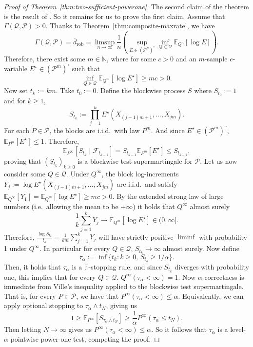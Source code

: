 \documentclass[11pt]{article}
\newcommand{\E}{\mathbb{E}}
\newcommand{\Pcal}{\mathcal{P}}
\newcommand{\Qcal}{\mathcal{Q}}
\newcommand{\bbF}{\mathbb F}
\theoremstyle{definition}
\theoremstyle{definition}
\begin{document}
\begin{proof}[Proof of Theorem~\ref{thm:two-sufficient-powerone}]
The second claim of the theorem is the result of \parencite[Theorem~1]{ram2026powersequentialtestsexist}. So it remains for us to prove the first claim. Assume that $\Gamma(\Qcal,\Pcal)>0$. Thanks to Theorem~\ref{thm:composite-maxrate}, we have
\[
\Gamma(\Qcal,\Pcal)=\overline d_{\mathrm{rob}}=\limsup_{n\to\infty}\frac1n\left(\sup_{E\in(\Pcal^n)^\circ}\inf_{Q\in\Qcal}\E_{Q^n}[\log E]\right).
\]
Therefore, there exist some $m\in\mathbb N$, where for some $c>0$ and an $m$-sample $e$-variable $E^{\star}\in(\Pcal^m)^{\circ}$ such that
\[
\inf_{Q\in\Qcal}\E_{Q^m}[\log E^{\star}]\ge mc>0.
\]
Now set $t_k:=km$. Take $t_0:=0$. Define the blockwise process $S$ where $S_{t_0}:=1$ and for $k\ge 1$,
\[
S_{t_k}:=\prod_{j=1}^kE^\star(X_{(j-1)m+1},\ldots,X_{jm}).
\]
For each $P\in\Pcal$, the blocks are i.i.d.\ with law $P^m$. And since $E^{\star}\in(\Pcal^m)^{\circ}$, $\E_{P^m}[E^{\star}]\le1$. Therefore,
\[
\E_{P^{\infty}}[S_{t_k}\mid \mathcal F_{t_{k-1}}]= S_{t_{k-1}}\E_{P^m}[E^\star]\le S_{t_{k-1}},
\]
proving that $(S_{t_k})_{k\ge 0}$ is a blockwise test supermartingale for $\Pcal$. Let us now consider some $Q\in\Qcal$. Under $Q^{\infty}$, the block log-increments
\(
Y_j:=\log E^\star(X_{(j-1)m+1},\ldots,X_{jm})
\)
are i.i.d.\ and satisfy $\E_{Q^{\infty}}[Y_1]=\E_{Q^m}[\log E^{\star}]\ge mc>0$. By the extended strong law of large numbers (i.e.\ allowing the mean to be $+\infty$) it holds that $Q^{\infty}$ almost surely
\[
\frac1k\sum_{j=1}^kY_j \longrightarrow \E_{Q^m}[\log E^\star] \in(0,\infty].
\]
Therefore, $\frac{\log S_{t_k}}{t_k}=\frac{1}{km}\sum_{j=1}^k Y_j$ will have strictly positive $\liminf$ with probability 1 under $Q^{\infty}$. In particular for every $Q\in\Qcal$, $S_{t_k}\to\infty$ almost surely. Now define
\[
\tau_{\alpha}:=\inf\{t_k:k\ge 0,\, S_{t_k}\ge 1/\alpha\}.
\]
Then, it holds that $\tau_\alpha$ is a $\bbF$-stopping rule, and since $S_{t_k}$ diverges with probability one, this implies that for every $Q\in\Qcal$. $Q^{\infty}(\tau_{\alpha}<\infty)=1$. Now $\alpha$-correctness is immediate from Ville's inequality applied to the blockwise test supermartingale. That is, for every $P\in\Pcal$, we have that $P^{\infty}(\tau_{\alpha}<\infty)\le\alpha$. Equivalently, we can apply optional stopping to $\tau_{\alpha}\wedge t_N$, giving us
\[
1\ge \E_{P^{\infty}}[S_{\tau_{\alpha}\wedge t_N}]\ge \frac{1}{\alpha}P^{\infty}(\tau_{\alpha}\le t_N).
\]
Then letting $N\to\infty$ gives us $P^{\infty}(\tau_{\alpha}<\infty)\le \alpha$. So it follows that $\tau_{\alpha}$ is a level-$\alpha$ pointwise power-one test, competing the proof.
\end{proof}
\end{document}
